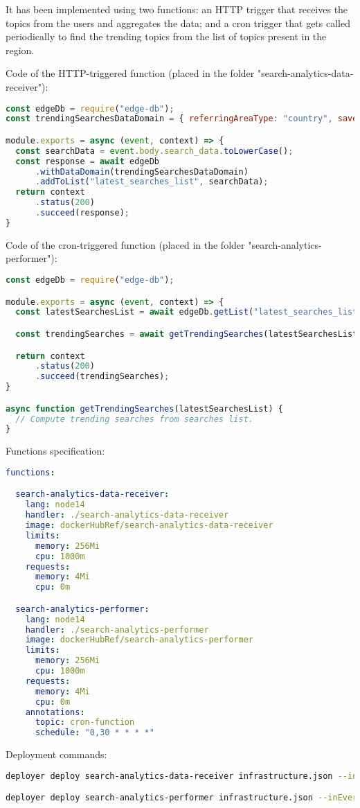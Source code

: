 It has been implemented using two functions: an HTTP trigger that receives the topics from the users and aggregates the data; and a cron trigger that gets called periodically to find the trending topics from the list of topics present in the region.

Code of the HTTP-triggered function (placed in the folder "search-analytics-data-receiver"):
\begin{lstlisting}[language=javascript]
const edgeDb = require("edge-db");
const trendingSearchesDataDomain = { referringAreaType: "country", saveAlsoInIntermediateLevels: true, ttl: 4*60*60*1000  }; // 4 hours TTL.

module.exports = async (event, context) => {
  const searchData = event.body.search_data.toLowerCase();
  const response = await edgeDb
      .withDataDomain(trendingSearchesDataDomain)
      .addToList("latest_searches_list", searchData);
  return context
      .status(200)
      .succeed(response);
}
\end{lstlisting}

Code of the cron-triggered function (placed in the folder "search-analytics-performer"):
\begin{lstlisting}[language=javascript]
const edgeDb = require("edge-db");

module.exports = async (event, context) => {
  const latestSearchesList = await edgeDb.getList("latest_searches_list");

  const trendingSearches = await getTrendingSearches(latestSearchesList);

  return context
      .status(200)
      .succeed(trendingSearches);
}

async function getTrendingSearches(latestSearchesList) {
  // Compute trending searches from searches list.
}
\end{lstlisting}

Functions specification:
\begin{lstlisting}[language=yaml,firstnumber=1]
functions:

  search-analytics-data-receiver:
    lang: node14
    handler: ./search-analytics-data-receiver
    image: dockerHubRef/search-analytics-data-receiver
    limits:
      memory: 256Mi
      cpu: 1000m
    requests:
      memory: 4Mi
      cpu: 0m

  search-analytics-performer:
    lang: node14
    handler: ./search-analytics-performer
    image: dockerHubRef/search-analytics-performer
    limits:
      memory: 256Mi
      cpu: 1000m
    requests:
      memory: 4Mi
      cpu: 0m
    annotations:
      topic: cron-function
      schedule: "0,30 * * * *"
\end{lstlisting}

Deployment commands:
\begin{lstlisting}[language=bash]
deployer deploy search-analytics-data-receiver infrastructure.json --inEvery city

deployer deploy search-analytics-performer infrastructure.json --inEvery territory
\end{lstlisting}
